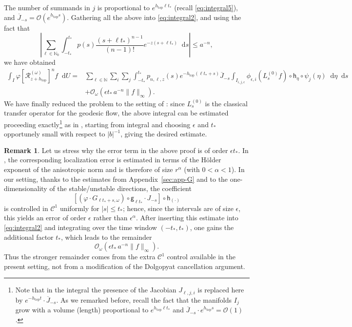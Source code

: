 \documentclass[11pt,letterpaper]{amsart}
\newcommand \cR {{\mathcal R}}
\newcommand \cO {{\mathcal{O}}}
\newcommand{\horo}{\mathsf{h}}
\newcommand{\geo}{\mathsf{g}}
\newcommand*{\diff}{\mathop{}\!\mathrm{d}}
\newcommand{\eps}{\epsilon}
\DeclareMathOperator{\topp}{top}
\theoremstyle{definition}
\newtheorem{remark}[theorem]{Remark}
\begin{document}
The number of summands in $j$ is proportional to $e^{h_{\topp} \ell {t_*}}$ (recall \eqref{eq:integral5}), and ${\overline J_{-s}} = \cO(e^{h_{\topp}s})$. 
Gathering all the above into \eqref{eq:integral2}, and using the fact that  
\[
\left|\sum_{\ell \in \mathbb{N}_0} \int_{-{t_*}}^{t_*} p(s) \frac{(s+\ell {t_*})^{n-1}}{(n-1) !} e^{-z(s+\ell {t_*})}\diff s\right|\le a^{-n},
\]
we have obtained
\[
\begin{split}
\int_I \varphi[\cR^{(\omega)}_{z+h_{\topp}}]^n f \diff U = & \sum_{\ell \in \mathbb{N}}\sum_{i}\sum_{j} \int_{-{t_*}}^{t_*} p_{n, \ell, z}(s)e^{-h_{\topp}(\ell t_*+s)} {\overline J_{-s}} \int_{I_{i,j,\eps}}\phi_{\eps,i} (L^{(0)}_{s}f)\circ \horo_\eta\circ \psi_j(\eta) \diff \eta \diff s\\
&+\cO_\omega(\eps {t_*} \, a^{-n}\|f\|_\infty).
\end{split}
\]
We have finally reduced the problem to the setting of \cite[\S5.7]{DeKiLi}: since $L^{(0)}_s$ is the classical transfer operator for the geodesic flow, the above integral can be estimated proceeding exactly\footnote{Note that in the integral \cite[(5.7.8)]{DeKiLi} the presence of the Jacobian $J_{\ell,j,i}$ is replaced here by $e^{-h_{\topp}t} \cdot {\overline J_{-s}}$. As we remarked before, recall the fact that the manifolds $I_j$ grow with a volume (length) proportional to $e^{h_{\topp} \ell t_*}$ and ${\overline J_{-s}} \cdot e^{h_{\topp}s} = \cO(1)$.} as in \cite{DeKiLi}, starting from integral \cite[(5.7.8)]{DeKiLi} and choosing $\eps$ and $t_*$ opportunely small with respect to $|b|^{-1}$, giving the desired estimate.


\begin{remark}
Let us stress why the error term in the above proof is of order $\eps t_*$. In \cite[\S5.7]{DeKiLi}, the corresponding localization error is estimated in terms of the H\"older exponent of the anisotropic norm and is therefore of size $r^\alpha$ (with $0<\alpha<1$). In our setting, thanks to the estimates from Appendix~\ref{sec:app-G} and to the one-dimensionality of the stable/unstable directions, the coefficient
\[
[(\varphi\cdot  G_{\ell {t_*}+s, \omega}) \circ \geo_{\ell t_*} \cdot J_{-s}]\circ \horo_{(\cdot)}
\]
is controlled in $\mathscr C^1$ uniformly for $|s|\le t_*$; hence, since the intervals are of size $\eps$, this yields an error of order $\eps$ rather than $\eps^\alpha$. After inserting this estimate into \eqref{eq:integral2} and integrating over the time window $(-t_*,t_*)$, one gains the additional factor $t_*$, which leads to the remainder
\[
\mathcal O_\omega(\eps t_*\, a^{-n}\|f\|_\infty).
\]
Thus the stronger remainder comes from the extra $\mathscr C^1$ control available in the present setting, not from a modification of the Dolgopyat cancellation argument.
\end{remark}
\end{document}
